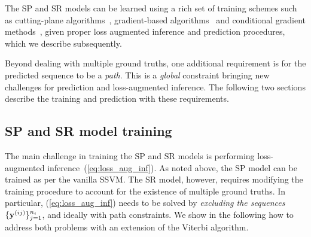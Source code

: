 
The SP and SR models can be learned using a rich set of training schemes such as
cutting-plane algorithms~\cite{joachims2009predicting}, %
gradient-based algorithms~\cite{ratliff2006subgradient} %
and conditional gradient methods~\cite{lacoste2013block}, %
given proper loss augmented inference and prediction procedures,
which we describe subsequently. %

Beyond dealing with multiple ground truths,
one additional requirement is for the predicted sequence to be a {\em path}.
This is a {\em global} constraint bringing new challenges for prediction and loss-augmented inference.
The following two sections describe the training and prediction with these requirements.

\subsection{SP and SR model training}
\label{ssec:training}

The main challenge in training the SP and SR models is performing loss-augmented inference~(\ref{eq:loss_aug_inf}).
As noted above, the SP model can be trained as per the vanilla SSVM.
The SR model, however, requires modifying the training procedure to account for the existence of multiple ground truths.
In particular, (\ref{eq:loss_aug_inf}) needs to be solved by \emph{excluding the sequences} $\{\mathbf{y}^{({ij})}\}_{j=1}^{n_i}$, and ideally with {\sc path} constraints.
We show in the following how to address both problems with an extension of the Viterbi algorithm.

